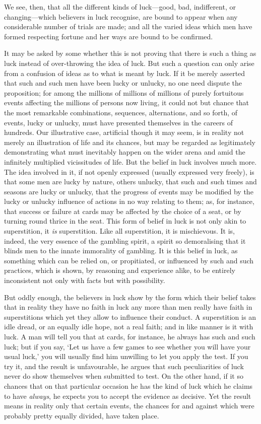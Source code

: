 \documentclass[letterpaper,12pt,oneside,openany]{memoir}
\begin{document}
We see, then, that all the different kinds of luck---good,
bad, indifferent, or changing---which believers in
luck recognise, are bound to appear when any considerable
number of trials are made; and all the varied
ideas which men have formed respecting fortune and
her ways are bound to be confirmed.

It may be asked by some whether this is not proving
that there is such a thing as luck instead of over-throwing
the idea of luck. But such a question can
only arise from a confusion of ideas as to what is meant
by luck. If it be merely asserted that such and such
men have been lucky or unlucky, no one need dispute
the proposition; for among the millions of millions of
millions of purely fortuitous events affecting the millions
of persons now living, it could not but chance that
the most remarkable combinations, sequences, alternations,
and so forth, of events, lucky or unlucky, must
have presented themselves in the careers of hundreds.
Our illustrative case, artificial though it may seem, is
in reality not merely an illustration of life and its
chances, but may be regarded as legitimately demonstrating
what must inevitably happen on the wider
arena and amid the infinitely multiplied vicissitudes of
life. But the belief in luck involves much more. The
idea involved in it, if not openly expressed (usually
expressed very freely), is that some men are lucky by
nature, others unlucky, that such and such times and
seasons are lucky or unlucky, that the progress of
events may be modified by the lucky or unlucky influence
of actions in no way relating to them; as, for
instance, that success or failure at cards may be affected
by the choice of a seat, or by turning round thrice in
the seat. This form of belief in luck is not only akin
to superstition, it \textit{is} superstition. Like all superstition,
it is mischievous. It is, indeed, the very essence of the
gambling spirit, a spirit so demoralising that it blinds
men to the innate immorality of gambling. It is this
belief in luck, as something which can be relied on, or
propitiated, or influenced by such and such practices,
which is shown, by reasoning and experience alike, to
be entirely inconsistent not only with facts but with
possibility.

But oddly enough, the believers in luck show by
the form which their belief takes that in reality they
have no faith in luck any more than men really have
faith in superstitions which yet they allow to influence
their conduct. A superstition is an idle dread, or an
equally idle hope, not a real faith; and in like manner
is it with luck. A man will tell you that at cards, for
instance, he always has such and such luck; but if you
say, `Let us have a few games to see whether you will
have your usual luck,' you will usually find him unwilling
to let you apply the test. If you try it, and
the result is unfavourable, he argues that such peculiarities
of luck never do show themselves when submitted
to test. On the other hand, if it so chances
that on that particular occasion he has the kind of
luck which he claims to have \textit{always}, he expects you
to accept the evidence as decisive. Yet the result
means in reality only that certain events, the chances
for and against which were probably pretty equally
divided, have taken place.
\end{document}
